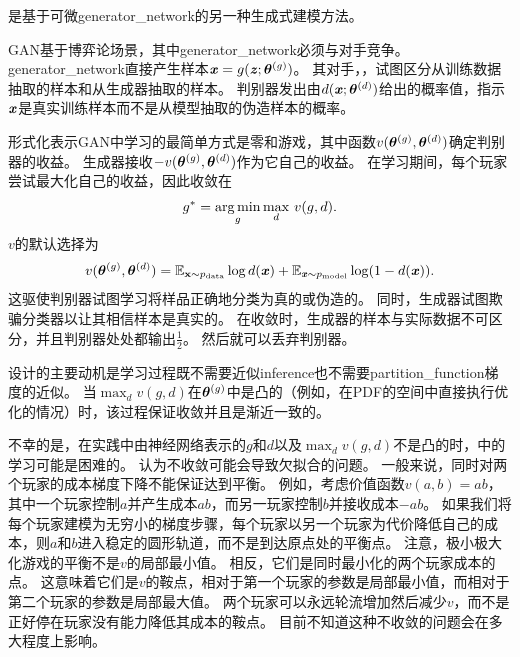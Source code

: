 \citep{Goodfellow-et-al-NIPS2014-small}是基于可微\gls{generator_network}的另一种生成式建模方法。


\gls{GAN}基于博弈论场景，其中\gls{generator_network}必须与对手竞争。
\gls{generator_network}直接产生样本$\boldsymbol{\mathit{x}} = g(\boldsymbol{\mathit{z}}; \boldsymbol{\theta}^{(g)})$。
其对手，，试图区分从训练数据抽取的样本和从生成器抽取的样本。
判别器发出由$d(\boldsymbol{\mathit{x}}; \boldsymbol{\theta}^{(d)})$给出的概率值，指示$\boldsymbol{\mathit{x}}$是真实训练样本而不是从模型抽取的伪造样本的概率。



形式化表示\gls{GAN}中学习的最简单方式是零和游戏，其中函数$v(\boldsymbol{\theta}^{(g)}, \boldsymbol{\theta}^{(d)})$确定判别器的收益。
生成器接收$-v(\boldsymbol{\theta}^{(g)}, \boldsymbol{\theta}^{(d)})$作为它自己的收益。
在学习期间，每个玩家尝试最大化自己的收益，因此收敛在
\begin{align}
 g^* = \underset{g}{\arg\min} \, \underset{d}{\max}~ v(g, d).
\end{align}
$v$的默认选择为
\begin{align}
 v(\boldsymbol{\theta}^{(g)}, \boldsymbol{\theta}^{(d)}) = \mathbb{E}_{\mathbf{x} \sim p_{\text{data}}} 
 \log d(\boldsymbol{\mathit{x}}) + \mathbb{E}_{\boldsymbol{\mathit{x}} \sim p_{\text{model}}} \log (1 - d(\boldsymbol{\mathit{x}})).
\end{align}
这驱使判别器试图学习将样品正确地分类为真的或伪造的。
同时，生成器试图欺骗分类器以让其相信样本是真实的。
在收敛时，生成器的样本与实际数据不可区分，并且判别器处处都输出$\frac{1}{2}$。
然后就可以丢弃判别器。


设计的主要动机是学习过程既不需要近似\gls{inference}也不需要\gls{partition_function}梯度的近似。
当$\max_d v(g,d)$在$\boldsymbol{\theta}^{(g)}$中是凸的（例如，在\gls{PDF}的空间中直接执行优化的情况）时，该过程保证收敛并且是渐近一致的。


不幸的是，在实践中由神经网络表示的$g$和$d$以及$\max_d v(g, d)$不是凸的时，中的学习可能是困难的。
\citet{Goodfellow-ICLR2015} 认为不收敛可能会导致欠拟合的问题。
一般来说，同时对两个玩家的成本梯度下降不能保证达到平衡。
例如，考虑价值函数$v(a,b) = ab$，其中一个玩家控制$a$并产生成本$ab$，而另一玩家控制$b$并接收成本$-ab$。
如果我们将每个玩家建模为无穷小的梯度步骤，每个玩家以另一个玩家为代价降低自己的成本，则$a$和$b$进入稳定的圆形轨道，而不是到达原点处的平衡点。
注意，极小极大化游戏的平衡不是$v$的局部最小值。
相反，它们是同时最小化的两个玩家成本的点。
这意味着它们是$v$的鞍点，相对于第一个玩家的参数是局部最小值，而相对于第二个玩家的参数是局部最大值。
两个玩家可以永远轮流增加然后减少$v$，而不是正好停在玩家没有能力降低其成本的鞍点。
目前不知道这种不收敛的问题会在多大程度上影响。
 
